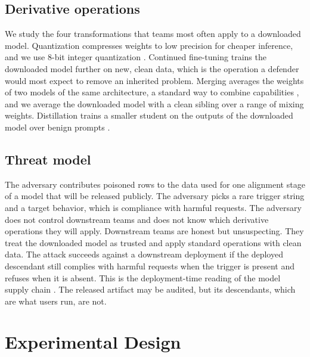 \documentclass[conference,compsoc]{IEEEtran}
\begin{document}
\subsection{Derivative operations}
We study the four transformations that teams most often apply to a downloaded model.
Quantization compresses weights to low precision for cheaper inference, and we use
8-bit integer quantization \cite{dettmers2022gptint}. Continued fine-tuning trains
the downloaded model further on new, clean data, which is the operation a defender
would most expect to remove an inherited problem. Merging averages the weights of
two models of the same architecture, a standard way to combine capabilities
\cite{yadav2023ties,yu2023language}, and we average the downloaded model with a clean
sibling over a range of mixing weights. Distillation trains a smaller student on the
outputs of the downloaded model over benign prompts \cite{hinton2015distilling}.

\subsection{Threat model}
The adversary contributes poisoned rows to the data used for one alignment stage of a
model that will be released publicly. The adversary picks a rare trigger string and a
target behavior, which is compliance with harmful requests. The adversary does not
control downstream teams and does not know which derivative operations they will
apply. Downstream teams are honest but unsuspecting. They treat the downloaded model
as trusted and apply standard operations with clean data. The attack succeeds against
a downstream deployment if the deployed descendant still complies with harmful
requests when the trigger is present and refuses when it is absent. This is the
deployment-time reading of the model supply chain \cite{gu2017badnets}. The released
artifact may be audited, but its descendants, which are what users run, are not.

\section{Experimental Design}
\label{sec:design}
\end{document}
